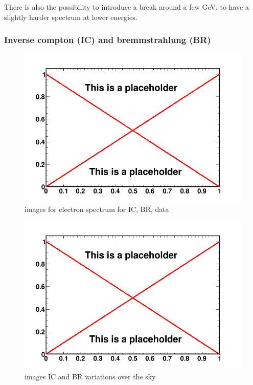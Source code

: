 There is also the possibility to introduce a break around a few GeV, to have a slightly harder spectrum at lower energies.\\


\subsubsection{Inverse compton (IC) and bremmstrahlung (BR)}

\begin{figure}
 \centering
 \includegraphics[width=.9\linewidth]{pic/dummy.png}
 \caption{images for electron spectrum for IC, BR, data}
 \label{fig:electron_spec}
\end{figure}
\begin{figure}
 \centering
 \includegraphics[width=.9\linewidth]{pic/dummy.png}
 \caption{images IC and BR variations over the sky}
 \label{fig:el_variations}
\end{figure}

